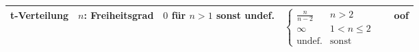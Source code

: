 \begin{fontsize}{10}{13}
{\begin{tabular}{||c|p{2cm}|*{4}{c|}|}
	t-Verteilung & $n$: Freiheitsgrad & $0$ für $n>1$ sonst undef. & $\begin{cases} \frac{n}{n-2}  &
	n > 2 \\ \infty & 1 < n \leq 2 \\ \text{undef.} & \text{sonst} \end{cases}$ &
	\raisebox{-2pt}{$\frac{\Gamma\left( \frac{n+1}{2}\right)}{\sqrt{n\pi} \cdot \Gamma(\frac{n}{2})}
	\left(1 + \frac{t^2}{n}\right)^{- \frac{n+1}{2}}$} & oof \\[10pt]
	\hline
\end{tabular}}
\end{fontsize}
\renewcommand{\arraystretch}{1}

